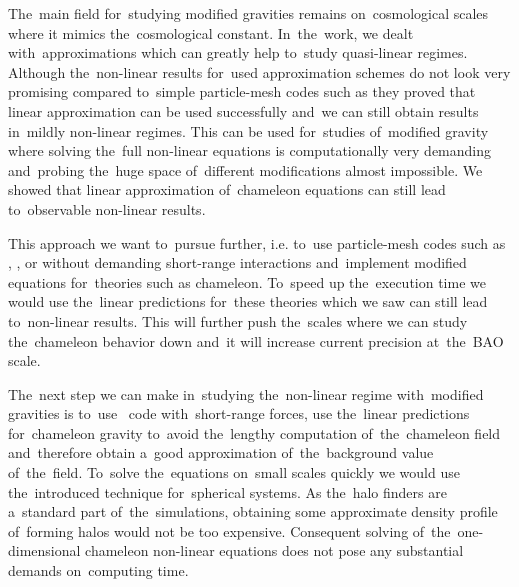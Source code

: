 The~main field for~studying modified gravities remains on~cosmological scales where it mimics the~cosmological constant. In~the~work, we dealt with~approximations which can greatly help to~study quasi-linear regimes. Although the~non-linear results for~used approximation schemes do not look very promising compared to~simple particle-mesh codes such as  they proved that linear approximation can be used successfully and~we can still obtain results in~mildly non-linear regimes. This can be used for~studies of~modified gravity where solving the~full non-linear equations is computationally very demanding and~probing the~huge space of~different modifications almost impossible. We showed that linear approximation of~chameleon equations can still lead to~observable non-linear results.

This approach we want to~pursue further, i.e. to~use particle-mesh codes such as , , or  without demanding short-range interactions and~implement modified equations for~theories such as chameleon. To~speed up the~execution time we would use the~linear predictions for~these theories which we saw can still lead to~non-linear results. This will further push the~scales where we can study the~chameleon behavior down and~it will increase current precision at~the~BAO scale.

The~next step we can make in~studying the~non-linear regime with~modified gravities is to~use \nbody\ code with~short-range forces, use the~linear predictions for~chameleon gravity to~avoid the~lengthy computation of~the~chameleon field and~therefore obtain a~good approximation of~the~background value of~the~field. To~solve the~equations on~small scales quickly we would use the~introduced technique for~spherical systems. As the~halo finders are a~standard part of~the~simulations, obtaining some approximate density profile of~forming halos would not be too expensive. Consequent solving of~the~one-dimensional chameleon non-linear equations does not pose any substantial demands on~computing time.